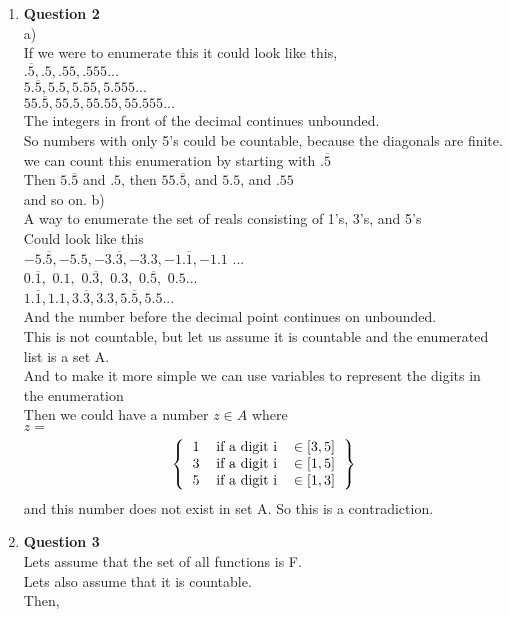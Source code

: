 \documentclass[12pt]{article}
\begin{document}
\begin{enumerate}
\item {\bf Question 2} \\
a) \\
If we were to enumerate this it could look like this,\\
$.\overline{5},.5, .55 , .555 ...$\\
$5.\overline{5},5.5, 5.55, 5.555...$\\
$55.\overline{5},55.5,55.55,55.555...$\\
The integers in front of the decimal continues unbounded. \\
So numbers with only 5's could be countable, because the diagonals are finite. \\
we can count this enumeration by starting with $.\overline{5}$ \\
Then $5.\overline{5}$ and $.5$, then $55.\overline{5}$, and  $5.5$, and $.55$\\
and so on.
b) \\
A way to enumerate the set of reals consisting of 1's, 3's, and 5's \\
Could look like this \\
$-5.\overline{5},-5.5, -3.\overline{3},-3.3, -1.\overline{1}, -1.1$ ... \\
  $ 0.\overline{1},$  $0.1,$   $0.\overline{3},$  $0.3,$  $0.\overline{5},$  $0.5$... \\
$1.\overline{1}, 1.1, 3.\overline{3}, 3.3, 5.\overline{5}, 5.5$... \\
And the number before the decimal point continues on unbounded. \\
This is not countable, but let us assume it is countable and the enumerated list is a set A.\\
And to make it more simple we can use variables to represent the digits in the enumeration \\
Then we could have a number $z \in A$ where \\
$z = $
\[
\left \{
  \begin{tabular}{ccc}
  $1$ & if a digit i & $\in [3,5]$ \\
  $3$& if a digit i & $\in [1,5]$ \\
  $5$ & if a digit i  & $\in [1,3]$ \\
  \end{tabular}
\right \}
\]
and this number does not exist in set A. 
So this is a contradiction. \\



\item {\bf Question 3} \\
Lets assume that the set of all functions is F. \\
Lets also assume that it is countable. \\
Then, \\



\end{enumerate}
\end{document}

